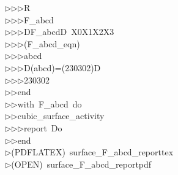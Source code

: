 \begin{tabbing}
$\triangleright$\>$\triangleright$\>$\triangleright$\>R\ \\[0pt]
$\triangleright$\>$\triangleright$\>$\triangleright$\>F\_abcd\ \\[0pt]
$\triangleright$\>$\triangleright$\>$\triangleright$\>DF\_abcdD\ X0X1X2X3\ \\[0pt]
$\triangleright$\>$\triangleright$\>$\triangleright$\>(F\_abcd\_eqn)\ \\[0pt]
$\triangleright$\>$\triangleright$\>$\triangleright$\>abcd\ \\[0pt]
$\triangleright$\>$\triangleright$\>$\triangleright$\>D(abcd)=(230302)D\ \\[0pt]
$\triangleright$\>$\triangleright$\>$\triangleright$\>230302\ \\[0pt]
$\triangleright$\>$\triangleright$\>end\ \\[0pt]
$\triangleright$\>$\triangleright$\>with\ F\_abcd\ do\ \\[0pt]
$\triangleright$\>$\triangleright$\>cubic\_surface\_activity\ \\[0pt]
$\triangleright$\>$\triangleright$\>$\triangleright$\>report\ Do\ \\[0pt]
$\triangleright$\>$\triangleright$\>end\\[0pt]
$\triangleright$\>(PDFLATEX)\ surface\_F\_abcd\_reporttex\\[0pt]
$\triangleright$\>(OPEN)\ surface\_F\_abcd\_reportpdf\\[0pt]
\end{tabbing}
